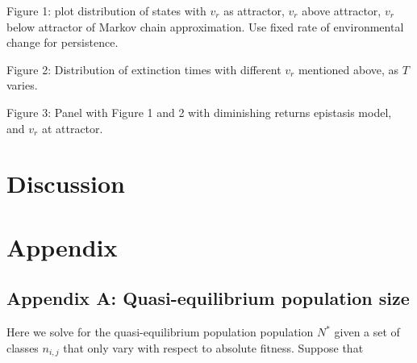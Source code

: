 \documentclass[9pt,twocolumn,twoside]{article}
\begin{document}
Figure 1: plot distribution of states with $v_r$ as attractor, $v_r$ above attractor, $v_r$ below attractor of Markov chain approximation. Use fixed rate of environmental change for persistence.

Figure 2: Distribution of extinction times with different $v_r$ mentioned above, as $T$ varies.

Figure 3: Panel with Figure 1 and 2 with diminishing returns epistasis model, and $v_r$ at attractor.
\section{Discussion}


\footnotesize



\newpage
\onecolumn
\appendix
\section*{Appendix} \label{sec:appendix}
\subsection*{Appendix A: Quasi-equilibrium population size}
Here we solve for the quasi-equilibrium population population $N^*$ given a set of classes $n_{i,j}$ that only vary with respect to absolute fitness. Suppose that 
\end{document}
